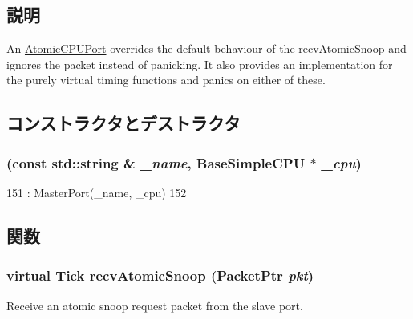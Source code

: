 \subsection{説明}
An \hyperlink{classAtomicSimpleCPU_1_1AtomicCPUPort}{AtomicCPUPort} overrides the default behaviour of the recvAtomicSnoop and ignores the packet instead of panicking. It also provides an implementation for the purely virtual timing functions and panics on either of these. 

\subsection{コンストラクタとデストラクタ}
\hypertarget{classAtomicSimpleCPU_1_1AtomicCPUPort_ab7510fb4487981ef766c2183a23534df}{
\subsubsection[{AtomicCPUPort}]{ (const std::string \& {\em \_\-name}, \/  {\bf BaseSimpleCPU} $\ast$ {\em \_\-cpu})}}
\label{classAtomicSimpleCPU_1_1AtomicCPUPort_ab7510fb4487981ef766c2183a23534df}



\begin{DoxyCode}
151             : MasterPort(_name, _cpu)
152         { }
\end{DoxyCode}


\subsection{関数}
\hypertarget{classAtomicSimpleCPU_1_1AtomicCPUPort_ae1160d8f94f042aba1dc9a07a72e1e82}{
\subsubsection[{recvAtomicSnoop}]{\setlength{\rightskip}{0pt plus 5cm}virtual {\bf Tick} recvAtomicSnoop ({\bf PacketPtr} {\em pkt})}}
\label{classAtomicSimpleCPU_1_1AtomicCPUPort_ae1160d8f94f042aba1dc9a07a72e1e82}
Receive an atomic snoop request packet from the slave port. 

